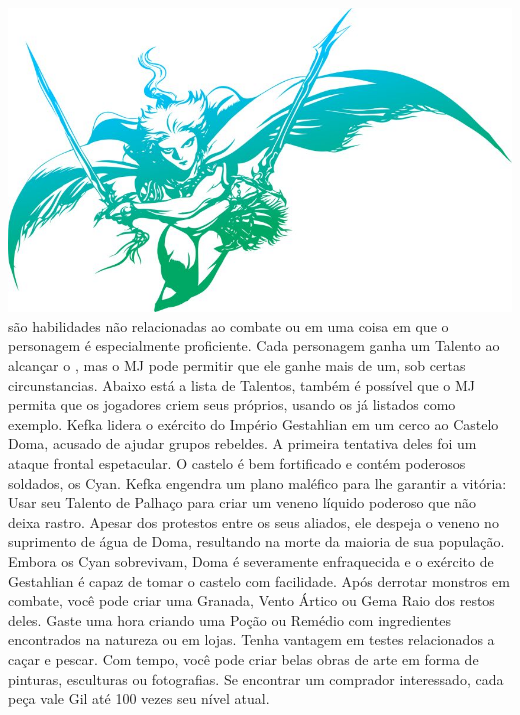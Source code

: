 %
\\
%
\includegraphics[width=\columnwidth]{./art/images/ff3.jpg}
%
\vfill
%
 são habilidades não relacionadas ao combate ou em uma coisa em que o personagem é especialmente proficiente.
Cada personagem ganha um Talento ao alcançar o , mas o MJ pode permitir que ele ganhe mais de um, sob certas circunstancias.
Abaixo está a lista de Talentos, também é possível que o MJ permita que os jogadores criem seus próprios, usando os já listados como exemplo.
%
\ofpar
%
{
	Kefka lidera o exército do Império Gestahlian em um cerco ao Castelo Doma, acusado de ajudar grupos rebeldes.
	A primeira tentativa deles foi um ataque frontal espetacular.
	O castelo é bem fortificado e contém poderosos soldados, os Cyan.
	Kefka engendra um plano maléfico para lhe garantir a vitória:
	Usar seu Talento de Palhaço para criar um veneno líquido poderoso que não deixa rastro.
	Apesar dos protestos entre os seus aliados, ele despeja o veneno no suprimento de água de Doma, resultando na morte da maioria de sua população.
	Embora os Cyan sobrevivam, Doma é severamente enfraquecida e o exército de Gestahlian é capaz de tomar o castelo com facilidade.
}	
%	
\ofpar\vfill
%
{
	Após derrotar monstros em combate, você pode criar uma Granada, Vento Ártico ou Gema Raio dos restos deles.
}
\vfill
{}
{
	Gaste uma hora criando uma Poção ou Remédio com ingredientes encontrados na natureza ou em lojas.
}
\vfill
{}
{
	Tenha vantagem em testes relacionados a caçar e pescar.
}
\vfill
{}
{
	Com tempo, você pode criar belas obras de arte em forma de pinturas, esculturas ou fotografias. 
	Se encontrar um comprador interessado, cada peça vale Gil até 100 vezes seu nível atual. 
}
